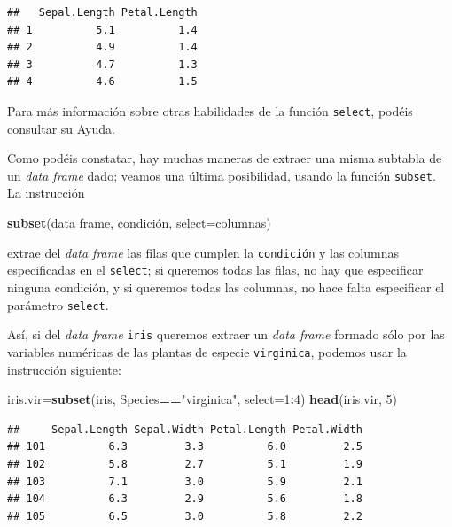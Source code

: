 \documentclass[]{book}
\newenvironment{Shaded}{\begin{snugshade}}{\end{snugshade}}
\newcommand{\DataTypeTok}[1]{\textcolor[rgb]{0.13,0.29,0.53}{#1}}
\newcommand{\DecValTok}[1]{\textcolor[rgb]{0.00,0.00,0.81}{#1}}
\newcommand{\KeywordTok}[1]{\textcolor[rgb]{0.13,0.29,0.53}{\textbf{#1}}}
\newcommand{\NormalTok}[1]{#1}
\newcommand{\OperatorTok}[1]{\textcolor[rgb]{0.81,0.36,0.00}{\textbf{#1}}}
\newcommand{\StringTok}[1]{\textcolor[rgb]{0.31,0.60,0.02}{#1}}
\theoremstyle{definition}
\theoremstyle{definition}
\theoremstyle{definition}
\theoremstyle{remark}
\begin{document}
\begin{verbatim}
##   Sepal.Length Petal.Length
## 1          5.1          1.4
## 2          4.9          1.4
## 3          4.7          1.3
## 4          4.6          1.5
\end{verbatim}

Para más información sobre otras habilidades de la función \texttt{select}, podéis consultar su Ayuda.

Como podéis constatar, hay muchas maneras de extraer una misma subtabla de un \emph{data frame} dado; veamos una última posibilidad, usando la función \texttt{subset}. La instrucción

\begin{Shaded}
\begin{Highlighting}[]
\KeywordTok{subset}\NormalTok{(data frame, condición, }\DataTypeTok{select=}\NormalTok{columnas)}
\end{Highlighting}
\end{Shaded}

extrae del \emph{data frame} las filas que cumplen la \texttt{condición} y las columnas especificadas en el \texttt{select}; si queremos todas las filas, no hay que especificar ninguna condición, y si queremos todas las columnas, no hace falta especificar el parámetro \texttt{select}.

Así, si del \emph{data frame} \texttt{iris} queremos extraer un \emph{data frame} formado sólo por las variables numéricas de las plantas de especie \texttt{virginica}, podemos usar la instrucción siguiente:

\begin{Shaded}
\begin{Highlighting}[]
\NormalTok{iris.vir=}\KeywordTok{subset}\NormalTok{(iris, Species}\OperatorTok{==}\StringTok{"virginica"}\NormalTok{, }\DataTypeTok{select=}\DecValTok{1}\OperatorTok{:}\DecValTok{4}\NormalTok{)}
\KeywordTok{head}\NormalTok{(iris.vir, }\DecValTok{5}\NormalTok{)}
\end{Highlighting}
\end{Shaded}

\begin{verbatim}
##     Sepal.Length Sepal.Width Petal.Length Petal.Width
## 101          6.3         3.3          6.0         2.5
## 102          5.8         2.7          5.1         1.9
## 103          7.1         3.0          5.9         2.1
## 104          6.3         2.9          5.6         1.8
## 105          6.5         3.0          5.8         2.2
\end{verbatim}
\end{document}
